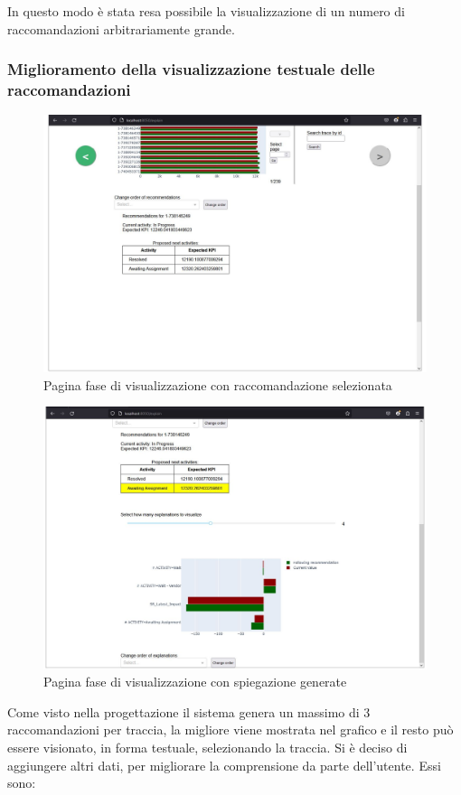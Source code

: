 In questo modo è stata resa possibile la visualizzazione di un numero di raccomandazioni arbitrariamente grande.

\subsubsection{Miglioramento della visualizzazione testuale delle raccomandazioni}
\begin{figure}[H] 
    \centering 
    \includegraphics[width=0.7\columnwidth]{immagini/pag-explain-selected-trace.jpg} 
    \caption{Pagina fase di visualizzazione con raccomandazione selezionata}
\end{figure}

\begin{figure}[H] 
    \centering 
    \includegraphics[width=0.7\columnwidth]{immagini/pag-explain-explanations.jpg} 
    \caption{Pagina fase di visualizzazione con spiegazione generate}
\end{figure}

Come visto nella progettazione il sistema genera un massimo di 3 raccomandazioni per traccia, la migliore viene mostrata nel grafico e il resto può essere visionato, in forma testuale, selezionando la traccia.
Si è deciso di aggiungere altri dati, per migliorare la comprensione da parte dell'utente. Essi sono:

